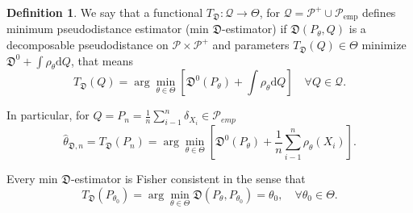 \documentclass[11pt,a4paper]{article}
\theoremstyle{definition}
\newtheorem{definition}{Definition}[section]
\theoremstyle{theorem}
\begin{document}
\begin{definition}
	We say that a functional $T_\mathfrak{D}:\mathcal{Q} \rightarrow \Theta$, for $\mathcal{Q}=\mathcal{P}^+ \cup \mathcal{P}_{\text{emp}}$	defines minimum pseudodistance estimator (min $\mathfrak{D}$-estimator) if $\mathfrak{D}(P_\theta,Q)$ is a decomposable pseudodistance on $\mathcal{P}\times\mathcal{P}^+$ and parameters $T_\mathfrak{D}(Q) \in \Theta$ minimize $\mathfrak{D}^0 + \int{\rho_\theta}\mathrm{d}Q$, that means
	\begin{equation}
		T_\mathfrak{D}(Q) = \arg\min_{\theta \in \Theta} \left[ \mathfrak{D}^0(P_\theta) + \int{\rho_\theta}\mathrm{d}Q \right] \quad \forall Q \in \mathcal{Q}.
	\end{equation}
\end{definition}

In particular, for $Q = P_n = \frac{1}{n}\sum_{i-1}^n \delta_{X_i} \in \mathcal{P}_{emp}$
\begin{equation}
	\hat{\theta}_{\mathfrak{D},n} =T_\mathfrak{D}(P_n)  = \arg\min_{\theta \in \Theta}\left[ \mathfrak{D}^0(P_\theta) + \dfrac{1}{n} \sum_{i-1}^n \rho_\theta (X_i) \right].
\end{equation}

Every min $\mathfrak{D}$-estimator is Fisher consistent in the sense that 
\begin{equation}
	T_\mathfrak{D}(P_{\theta_0}) = \arg\min_{\theta \in \Theta} \mathfrak{D}(P_\theta, P_{\theta_0}) = \theta_0,\quad \forall \theta_0 \in \Theta.
\end{equation}
\end{document}
